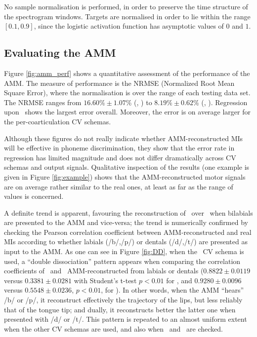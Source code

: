 No sample normalisation is performed, in order to preserve the time structure of the
spectrogram windows. Targets are normalised in order to lie within the range $[0.1,0.9]$,
since the logistic activation function has asymptotic values of $0$ and $1$.

\subsection{Evaluating the AMM}
\label{subsec:amm_results}

Figure \ref{fig:amm_perf} shows a quantitative assessment of the performance
of the AMM. The measure of performance is the NRMSE (Normalized Root Mean Square Error),
where the normalisation is over the range of each testing data set. The NRMSE
ranges from $16.60\% \pm 1.07\%$ (\vlio, \cob) to $8.19\% \pm 0.62\%$ (\vttu, \spkc).
Regression upon \vlio\ shows the largest error overall. Moreover, the error is on average
larger for the per-coarticulation CV schemas.

Although these figures do not really indicate whether AMM-reconstructed MIs will be
effective in phoneme discrimination, they show that the error rate in regression has
limited magnitude and does not differ dramatically across CV schemas and output signals.
Qualitative inspection of the results (one example is given in Figure \ref{fig:example})
shows that the AMM-reconstructed motor signals are on average rather
similar to the real ones, at least as far as the range of values is concerned.

A definite trend is apparent, favouring the reconstruction of \vlio\ over \vttu\ when
bilabials are presented to the AMM and vice-versa; the trend is numerically confirmed
by checking the Pearson correlation coefficient between AMM-reconstructed and real MIs
according to whether labials (/b/,/p/) or dentals (/d/,/t/) are presented as input
to the AMM. As one can see in Figure \ref{fig:DD}, when the \overall\ CV schema is used,
a ``double dissociation'' pattern appears when comparing the correlation coefficients of
\vlio\ and \vttu\ AMM-reconstructed from labials or dentals
($0.8822 \pm 0.0119$ versus $0.3381 \pm 0.0281$ with Student's t-test $p<0.01$ for \vlio, and
 $0.9280 \pm 0.0096$ versus $0.5548 \pm 0.0236$, $p<0.01$, for \vttu).
In other words, when the AMM
``hears'' /b/ or /p/, it reconstruct effectively the trajectory of the lips, but less
reliably that of the tongue tip; and dually, it reconstructs better the latter one when
presented with /d/ or /t/. This pattern is repeated to an almost uniform extent when the
other CV schemas are used, and also when \alio\ and \attu\ are checked.
